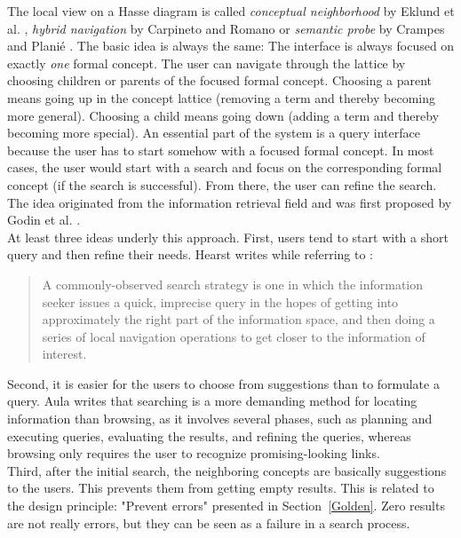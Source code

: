 \documentclass[11pt]{report}
\begin{document}
The local view on a Hasse diagram is called \textit{conceptual neighborhood} by Eklund et al. \cite{Eklund2009,Eklund2012}, \textit{hybrid navigation} by Carpineto and Romano \cite{Carpineto1996} or \textit{semantic probe} by Crampes and Planié \cite{crampes2014visualizing}. The basic idea is always the same: The interface is always focused on exactly \textit{one} formal concept. The user can navigate through the lattice by choosing children or parents of the focused formal concept. Choosing a parent means going up in the concept lattice (removing a term and thereby becoming more general). Choosing a child means going down (adding a term and thereby becoming more special). An essential part of the system is a query interface because the user has to start somehow with a focused formal concept. In most cases, the user would start with a search and focus on the corresponding formal concept (if the search is successful). From there, the user can refine the search. The idea originated from the information retrieval field and was first proposed by Godin et al. \cite{Godin1989}. \\

At least three ideas underly this approach. First, users tend to start with a short query and then refine their needs. Hearst \cite{Hearst2009} writes while referring to \cite{Marchionini2006,Bates1990}:
\begin{quote}
	A commonly-observed search strategy is one in which the information seeker issues a quick, imprecise query in the hopes of getting into approximately the right part of the information space, and then doing a series of local navigation operations to get closer to the information of interest.
\end{quote}

Second, it is easier for the users to choose from suggestions than to formulate a query. Aula \cite{Aula2005} writes that searching is a more demanding method for locating information than browsing, as it involves several phases, such as planning and executing queries, evaluating the results, and refining the queries, whereas browsing only requires the user to recognize promising-looking links. \\

Third, after the initial search, the neighboring concepts are basically suggestions to the users. This prevents them from getting empty results. This is related to the design principle: "Prevent errors" presented in Section~\ref{Golden}. Zero results are not really errors, but they can be seen as a failure in a search process.\\
\end{document}
